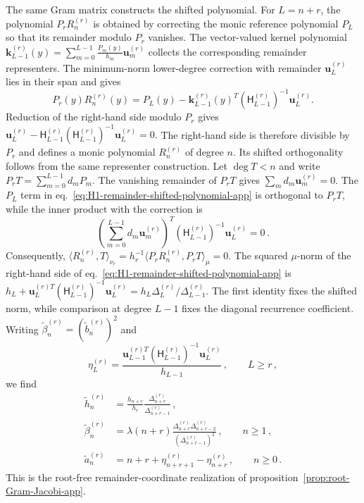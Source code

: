 \documentclass[a4paper,11pt]{article}
\theoremstyle{definition}
\theoremstyle{remark}
\begin{document}
The same Gram matrix constructs the shifted polynomial. For $L=n+r$, the polynomial $P_rR_n^{(r)}$ is obtained by correcting the monic reference polynomial $P_L$ so that its remainder modulo $P_r$ vanishes. The vector-valued kernel polynomial
$ 
   \mathbf k_{L-1}^{(r)}(y)=
   \sum_{m=0}^{L-1}\frac{P_m(y)}{h_m}\mathbf u_m^{(r)}
$
collects the corresponding remainder representers. The minimum-norm lower-degree correction with remainder $\mathbf u_L^{(r)}$ lies in their span and gives
\begin{equation}
   P_r(y)R_n^{(r)}(y)=P_L(y)
   -\mathbf k_{L-1}^{(r)}(y)^T
   (\mathsf H_{L-1}^{(r)})^{-1}\mathbf u_L^{(r)}.
   \label{eq:H1-remainder-shifted-polynomial-app}
\end{equation}
Reduction of the right-hand side modulo $P_r$ gives
\(
\mathbf u_L^{(r)}-\mathsf H_{L-1}^{(r)}
(\mathsf H_{L-1}^{(r)})^{-1}\mathbf u_L^{(r)}=0.
\)
The right-hand side is therefore divisible by $P_r$ and defines a monic polynomial $R_n^{(r)}$ of degree $n$. Its shifted orthogonality follows from the same representer construction. Let $\deg T<n$ and write $P_rT=\sum_{m=0}^{L-1}d_mP_m$. The vanishing remainder of $P_rT$ gives $\sum_m d_m\mathbf u_m^{(r)}=0$. The $P_L$ term in eq.~\eqref{eq:H1-remainder-shifted-polynomial-app} is orthogonal to $P_rT$, while the inner product with the correction is
\begin{equation}
   \left(\sum_{m=0}^{L-1}d_m\mathbf u_m^{(r)}\right)^T
   (\mathsf H_{L-1}^{(r)})^{-1}\mathbf u_L^{(r)}=0\,.
\end{equation}
Consequently,
\(
\langle R_n^{(r)},T\rangle_{\nu_r}
=h_r^{-1}\langle P_rR_n^{(r)},P_rT\rangle_\mu=0.
\)
The squared $\mu$-norm of the right-hand side of eq.~\eqref{eq:H1-remainder-shifted-polynomial-app} is
\(
h_L+\mathbf u_L^{(r)T}(\mathsf H_{L-1}^{(r)})^{-1}\mathbf u_L^{(r)}
=h_L\Delta_L^{(r)}/\Delta_{L-1}^{(r)}.
\)
The first identity fixes the shifted norm, while comparison at degree $L-1$ fixes the diagonal recurrence coefficient. Writing $\widetilde\beta_n^{(r)}=(\widetilde b_n^{(r)})^2$ and
\begin{equation}
   \eta_L^{(r)}=
   \frac{\mathbf u_{L-1}^{(r)T}
   (\mathsf H_{L-1}^{(r)})^{-1}\mathbf u_L^{(r)}}{h_{L-1}}\,,
   \qquad L\ge r\,,
   \label{eq:H1-eta-definition-app}
\end{equation}
we find
\begin{equation}
\begin{aligned}
   \widetilde h_n^{(r)}
   &=\frac{h_{n+r}}{h_r}
      \frac{\Delta_{n+r}^{(r)}}{\Delta_{n+r-1}^{(r)}}\,,\\
   \widetilde\beta_n^{(r)}
   &=\lambda(n+r)
      \frac{\Delta_{n+r}^{(r)}\Delta_{n+r-2}^{(r)}}
      {(\Delta_{n+r-1}^{(r)})^2}\,,\qquad n\ge1\,,\\
   \widetilde a_n^{(r)}
   &=n+r+\eta_{n+r+1}^{(r)}-\eta_{n+r}^{(r)}\,,
   \qquad n\ge0\,.
\end{aligned}
   \label{eq:H1-general-r-Jacobi-app}
\end{equation}
This is the root-free remainder-coordinate realization of
proposition~\ref{prop:root-Gram-Jacobi-app}.%
\end{document}

